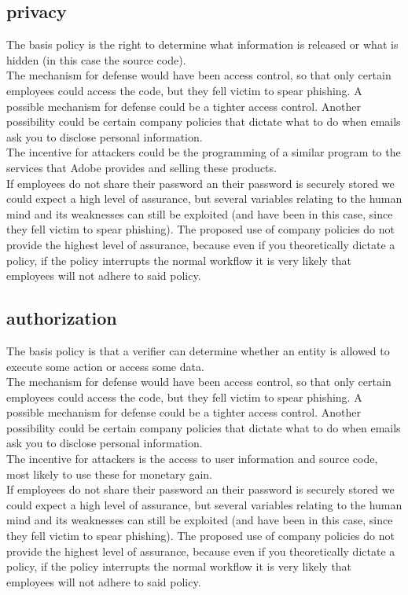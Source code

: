 \documentclass{article}
\begin{document}
\subsection{privacy}
The basis policy is the right to determine what information is released or what is hidden (in this case the source code).\\ \newline 
The mechanism for defense would have been access control, so that only certain employees could access the code, but they fell victim to spear phishing. A possible mechanism for defense could be a tighter access control. Another possibility could be certain company policies that dictate what to do when emails ask you to disclose personal information.\\ \newline
The incentive for attackers could be the programming of a similar program to the services that Adobe provides and selling these products.\\ \newline
If employees do not share their password an their password is securely stored we could expect a high level of assurance, but several variables relating to the human mind and its weaknesses can still be exploited (and have been in this case, since they fell victim to spear phishing). The proposed use of company policies do not provide the highest level of assurance, because even if you theoretically dictate a policy, if the policy interrupts the normal workflow it is very likely that employees will not adhere to said policy.

\subsection{authorization}
The basis policy is that a verifier can determine whether an entity is allowed to execute some action or access some data.\\ \newline
The mechanism for defense would have been access control, so that only certain employees could access the code, but they fell victim to spear phishing. A possible mechanism for defense could be a tighter access control. Another possibility could be certain company policies that dictate what to do when emails ask you to disclose personal information.\\ \newline
The incentive for attackers is the access to user information and source code, most likely to use these for monetary gain.\\ \newline
If employees do not share their password an their password is securely stored we could expect a high level of assurance, but several variables relating to the human mind and its weaknesses can still be exploited (and have been in this case, since they fell victim to spear phishing). The proposed use of company policies do not provide the highest level of assurance, because even if you theoretically dictate a policy, if the policy interrupts the normal workflow it is very likely that employees will not adhere to said policy.
\end{document}
